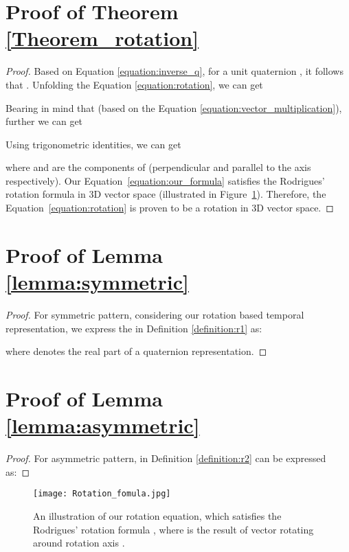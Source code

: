 \documentclass[11pt]{article}
\begin{document}





\clearpage
\appendix

\section{Proof of Theorem \ref{Theorem_rotation}}
\label{app:proof_theorem1}
\begin{proof}
Based on Equation \ref{equation:inverse_q}, for a unit quaternion , it follows that .
Unfolding the Equation \ref{equation:rotation}, we can get




Bearing in mind that  (based on the Equation \ref{equation:vector_multiplication}), further we can get




Using trigonometric identities, we can get

where  and  are the components of  (perpendicular and parallel to the axis  respectively).
Our Equation~\ref{equation:our_formula} satisfies the Rodrigues' rotation formula \cite{rodrigues1840lois} in 3D vector space (illustrated in Figure~\ref{figure:Fodrigues}).
Therefore, the Equation~\ref{equation:rotation} is proven to be a rotation in 3D vector space.
\end{proof}

\section{Proof of Lemma \ref{lemma:symmetric}}
\label{app:proof_symmetric}
\begin{proof}
For symmetric pattern, considering our rotation based temporal representation, we express the  in Definition \ref{definition:r1} as:

where  denotes the real part of a quaternion representation.
\end{proof}

\section{Proof of Lemma \ref{lemma:asymmetric}}
\label{app:proof_asymmetric}
\begin{proof}
For asymmetric pattern,  in Definition \ref{definition:r2} can be expressed as:

\end{proof}


\begin{figure}[!t]
\centering
\texttt{[image: Rotation\_fomula.jpg]} 
\caption{An illustration of our rotation equation, which satisfies the Rodrigues' rotation formula \cite{rodrigues1840lois}, where  is the result of vector  rotating  around rotation axis .}
\label{figure:Fodrigues}
\end{figure}
\end{document}
